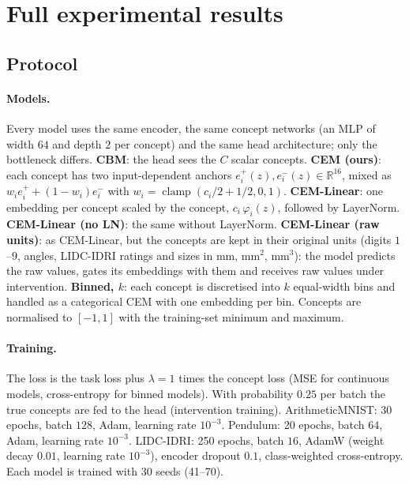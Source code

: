 
\section{Full experimental results}
\label{app:results}

\subsection{Protocol}
\label{app:protocol}

\paragraph{Models.} Every model uses the same encoder, the same concept
networks (an MLP of width $64$ and depth $2$ per concept) and the same head
architecture; only the bottleneck differs.
\textbf{CBM}: the head sees the $C$ scalar concepts.
\textbf{CEM (ours)}: each concept has two input-dependent anchors
$e_i^{+}(z), e_i^{-}(z) \in \mathbb{R}^{16}$, mixed as
$w_i e_i^{+} + (1 - w_i) e_i^{-}$ with $w_i = \operatorname{clamp}(c_i/2 + 1/2, 0, 1)$.
\textbf{CEM-Linear}: one embedding per concept scaled by the concept,
$c_i\,\varphi_i(z)$, followed by LayerNorm.
\textbf{CEM-Linear (no LN)}: the same without LayerNorm.
\textbf{CEM-Linear (raw units)}: as CEM-Linear, but the concepts are kept in
their original units (digits $1$--$9$, angles, LIDC-IDRI ratings and sizes in mm, mm$^2$, mm$^3$):
the model predicts the raw values, gates its embeddings with them and receives
raw values under intervention. 
\textbf{Binned, $k$}: each concept is discretised into $k$ equal-width bins and
handled as a categorical CEM with one embedding per bin.
Concepts are normalised to $[-1, 1]$ with the training-set minimum and maximum.

\paragraph{Training.} The loss is the task loss plus $\lambda = 1$ times the
concept loss (MSE for continuous models, cross-entropy for binned models).
With probability $0.25$ per batch the true concepts are fed to the head
(intervention training). ArithmeticMNIST: 30 epochs, batch $128$, Adam, learning rate $10^{-3}$.
Pendulum: 20 epochs, batch $64$, Adam, learning rate $10^{-3}$.
LIDC-IDRI: 250 epochs, batch $16$, AdamW (weight decay $0.01$, learning rate
$10^{-3}$), encoder dropout $0.1$, class-weighted cross-entropy.
Each model is trained with 30 seeds (41--70).


